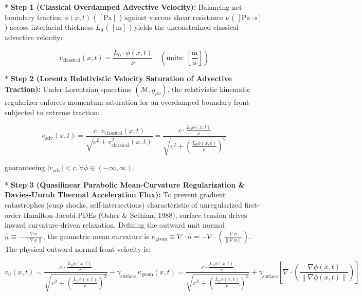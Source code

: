 \documentclass[11pt,a4paper]{article}
\theoremstyle{definition}
\theoremstyle{remark}
\begin{document}
* \textbf{Step 1 (Classical Overdamped Advective Velocity):}
Balancing net boundary traction $\phi(x, t)$ ( $[\mathrm{Pa}]$ ) against viscous shear resistance $\nu$ ( $[\mathrm{Pa \cdot s}]$ ) across interfacial thickness $L_0$ ( $[\mathrm{m}]$ ) yields the unconstrained classical advective velocity:


\begin{equation}
v_{\text{classical}}(x, t) = \frac{L_0 \cdot \phi(x, t)}{\nu} \quad \left( \text{units: } [\frac{\mathrm{m}}{\mathrm{s}}] \right)
\end{equation}


* \textbf{Step 2 (Lorentz Relativistic Velocity Saturation of Advective Traction):}
Under Lorentzian spacetime $(\mathcal{M}, g_{\mu\nu})$, the relativistic kinematic regularizer enforces momentum saturation for an overdamped boundary front subjected to extreme traction:


\begin{equation}
v_{\text{adv}}(x, t) = \frac{c \cdot v_{\text{classical}}(x, t)}{\sqrt{c^2 + v_{\text{classical}}^2(x, t)}} = \frac{c \cdot \frac{L_0 \phi(x, t)}{\nu}}{\sqrt{c^2 + \left(\frac{L_0 \phi(x, t)}{\nu}\right)^2}}
\end{equation}


guaranteeing $|v_{\text{adv}}| < c, \forall \phi \in (-\infty, \infty)$.

* \textbf{Step 3 (Quasilinear Parabolic Mean-Curvature Regularization \& Davies-Unruh Thermal Acceleration Flux):}
To prevent gradient catastrophes (cusp shocks, self-intersections) characteristic of unregularized first-order Hamilton-Jacobi PDEs (Osher \& Sethian, 1988), surface tension drives inward curvature-driven relaxation. Defining the outward unit normal $\hat{n} \equiv -\frac{\nabla \phi}{\|\nabla \phi\|}$, the geometric mean curvature is $\kappa_{\text{geom}} \equiv \nabla \cdot \hat{n} = -\nabla \cdot \left(\frac{\nabla \phi}{\|\nabla \phi\|}\right)$. The physical outward normal front velocity is:


\begin{equation}
\boxed{v_n(x, t) = \frac{c \cdot \frac{L_0 \phi(x, t)}{\nu}}{\sqrt{c^2 + \left(\frac{L_0 \phi(x, t)}{\nu}\right)^2}} - \gamma_{\text{surface}} \, \kappa_{\text{geom}}(x, t) = \frac{c \cdot \frac{L_0 \phi(x, t)}{\nu}}{\sqrt{c^2 + \left(\frac{L_0 \phi(x, t)}{\nu}\right)^2}} + \gamma_{\text{surface}} [ \nabla \cdot \left( \frac{\nabla \phi(x, t)}{\|\nabla \phi(x, t)\|} \right) ]}
\end{equation}
\end{document}
